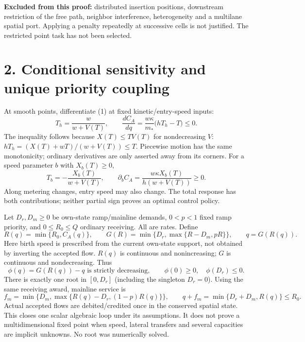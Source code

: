 \documentclass[11pt,a4paper]{article}
\begin{document}
\textbf{Excluded from this proof:} distributed insertion positions, downstream
restriction of the free path, neighbor interference, heterogeneity and a
multilane spatial port. Applying a penalty repeatedly at successive cells is
not justified. The restricted point task has not been selected.

\newpage
\section*{2. Conditional sensitivity and unique priority coupling}
At smooth points, differentiate (1) at fixed kinetic/entry-speed inputs:
\begin{equation}
 T_h=\frac{w}{w+V(T)},\qquad
 \frac{dC_A}{dq}=\frac{w\kappa}{m_*}\bigl(hT_h-T\bigr)\le0.
\end{equation}
The inequality follows because $X(T)\le TV(T)$ for nondecreasing $V$:
$hT_h=(X(T)+wT)/(w+V(T))\le T$. Piecewise motion has the same monotonicity;
ordinary derivatives are only asserted away from its corners.
For a speed parameter $b$ with $X_b(T)\ge0$,
\begin{equation}
 T_b=-\frac{X_b(T)}{w+V(T)},\qquad
 \partial_b C_A=\frac{w\kappa X_b(T)}{h(w+V(T))}\ge0.
\end{equation}
Along metering changes, entry speed may also change. The total response has
both contributions; neither partial sign proves an optimal control policy.

Let $D_r,D_m\ge0$ be own-state ramp/mainline demands, $0<p<1$ fixed ramp
priority, and $0\le R_0\le Q$ ordinary receiving. All are rates. Define
\begin{equation}
 R(q)=\min\{R_0,C_A(q)\},\qquad
 G(R)=\min\{D_r,\max\{R-D_m,pR\}\},\qquad q=G(R(q)).
\end{equation}
Here birth speed is prescribed from the current own-state support, not obtained
by inverting the accepted flow. $R(q)$ is continuous and nonincreasing; $G$ is
continuous and nondecreasing. Thus
\begin{equation}
 \phi(q)=G(R(q))-q\text{ is strictly decreasing},\qquad
 \phi(0)\ge0,\quad \phi(D_r)\le0.
\end{equation}
There is exactly one root in $[0,D_r]$ (including the singleton $D_r=0$).
Using the same receiving award, mainline service is
\begin{equation}
 f_m=\min\{D_m,\max\{R(q)-D_r,(1-p)R(q)\}\},\qquad
 q+f_m=\min\{D_r+D_m,R(q)\}\le R_0.
\end{equation}
Actual accepted flows are debited/credited once in the conserved spatial state.
This closes one scalar algebraic loop under its assumptions. It does not prove
a multidimensional fixed point when speed, lateral transfers and several
capacities are implicit unknowns. No root was numerically solved.
\end{document}
